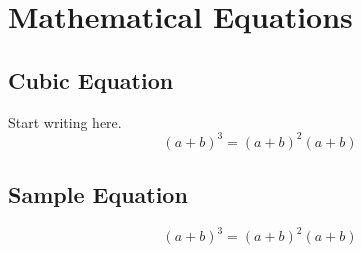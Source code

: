 \chapter{Mathematical Equations}
\section{Cubic Equation}
Start writing here.
\begin{equation}
(a+b)^3 = (a+b)^2(a+b)
\end{equation}

\section{Sample Equation}
\begin{equation}
(a+b)^3 = (a+b)^2(a+b)
\end{equation}